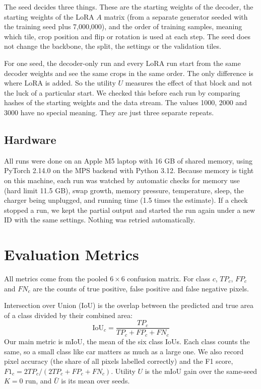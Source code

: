 \documentclass[11pt,a4paper]{report}
\begin{document}
The seed decides three things. These are the starting weights of the decoder, the starting weights of the LoRA $A$ matrix (from a separate generator seeded with the training seed plus 7,000,000), and the order of training samples, meaning which tile, crop position and flip or rotation is used at each step. The seed does not change the backbone, the split, the settings or the validation tiles.

For one seed, the decoder-only run and every LoRA run start from the same decoder weights and see the same crops in the same order. The only difference is where LoRA is added. So the utility $U$ measures the effect of that block and not the luck of a particular start. We checked this before each run by comparing hashes of the starting weights and the data stream. The values 1000, 2000 and 3000 have no special meaning. They are just three separate repeats.

\subsection{Hardware}

All runs were done on an Apple M5 laptop with 16 GB of shared memory, using PyTorch 2.14.0 on the MPS backend with Python 3.12. Because memory is tight on this machine, each run was watched by automatic checks for memory use (hard limit 11.5 GB), swap growth, memory pressure, temperature, sleep, the charger being unplugged, and running time (1.5 times the estimate). If a check stopped a run, we kept the partial output and started the run again under a new ID with the same settings. Nothing was retried automatically.

\section{Evaluation Metrics}

All metrics come from the pooled $6 \times 6$ confusion matrix. For class $c$, $TP_c$, $FP_c$ and $FN_c$ are the counts of true positive, false positive and false negative pixels.

Intersection over Union (IoU) is the overlap between the predicted and true area of a class divided by their combined area:
\begin{equation}
    \text{IoU}_c = \frac{TP_c}{TP_c + FP_c + FN_c}
\end{equation}
Our main metric is mIoU, the mean of the six class IoUs. Each class counts the same, so a small class like car matters as much as a large one. We also record pixel accuracy (the share of all pixels labelled correctly) and the F1 score, $F1_c = 2TP_c / (2TP_c + FP_c + FN_c)$. Utility $U$ is the mIoU gain over the same-seed $K = 0$ run, and $\bar U$ is its mean over seeds.
\end{document}
